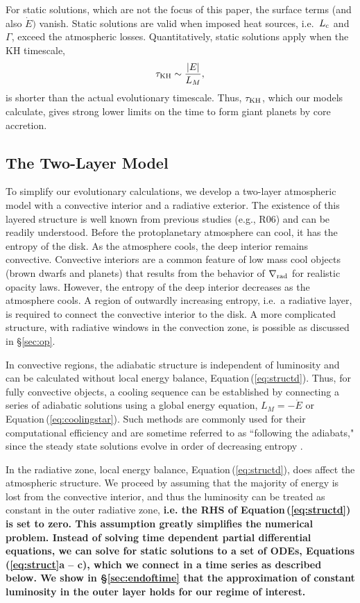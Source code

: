 \documentclass[apj, numberedappendix]{emulateapj}
\newcommand{\Eq}[1]{Equation\,(\ref{#1})}
\newcommand{\delrad}{\nabla_{\rm rad}}
\newcommand{\co}{_{\rm c}}
\begin{document}
For static solutions, which are not the focus of this paper, the surface terms (and also $\dot{E})$ vanish.  Static solutions are valid when imposed heat sources, i.e.\ $L\co$ and $\Gamma$, exceed the atmospheric losses.  Quantitatively, static solutions apply when the KH timescale,
\begin{equation}
\tau_{\rm KH} \sim {|E| \over L_M}, 
\end{equation} 
is shorter than the actual evolutionary timescale.  Thus, $\tau_{\rm KH}$, which our models calculate, gives strong lower limits on the time to form giant planets by core accretion.


\subsection{The Two-Layer Model} \label{sec:twolayer}

To simplify our evolutionary calculations, we develop a two-layer atmospheric model with a convective interior and a radiative exterior.   The existence of this layered structure is well known from previous studies (e.g., R06) and can be readily understood.  Before the protoplanetary atmosphere can cool, it has the entropy of the disk.  As the atmosphere cools, the deep interior remains convective.  Convective interiors are a common feature of low mass cool objects (brown dwarfs and planets) that results from the behavior of $\delrad$ for realistic opacity laws.  However, the entropy of the deep interior decreases as the atmosphere cools.  A region of outwardly increasing entropy, i.e.\ a radiative layer, is required to connect the convective interior to the disk.  A more complicated structure, with radiative windows in the convection zone, is possible as discussed in \S\ref{sec:op}. 

In convective regions, the adiabatic structure is independent of luminosity and can be calculated without local energy balance, \Eq{eq:structd}.  Thus, for fully convective objects, a cooling sequence can be established by connecting a series of adiabatic solutions using a global energy equation, $L_M = -\dot{E}$ or \Eq{eq:coolingstar}.  Such methods are commonly used for their computational efficiency and are sometime referred to as ``following the adiabats," since the steady state solutions evolve in order of decreasing entropy \citep{marleau13}.

In the radiative zone,  local energy balance, \Eq{eq:structd}, does affect the atmospheric structure.  We proceed by assuming that the majority of energy is lost from the convective interior, and thus the luminosity can be treated as constant in the outer radiative zone, \textbf{i.e. the RHS of \Eq{eq:structd} is set to zero.  This assumption greatly simplifies the numerical problem.  Instead of solving time dependent partial differential equations, we can solve for  static solutions to a set of ODEs, Equations (\ref{eq:struct}a -- c), which we connect in a time series as described below. We show in \S\ref{sec:endoftime} that the approximation of constant luminosity in the outer layer holds for our regime of interest.  } 
\end{document}
